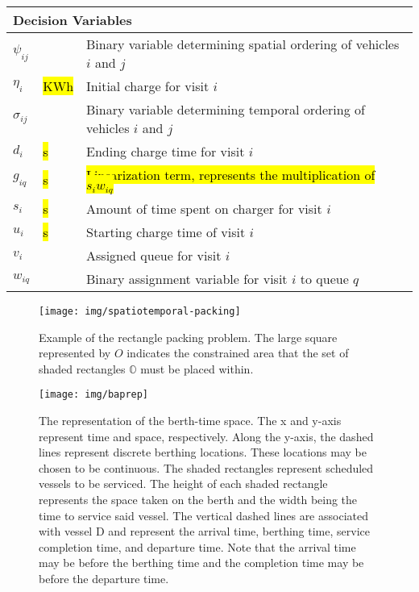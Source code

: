 \documentclass[utf8]{FrontiersinHarvard}
\begin{document}
\begin{table}[!htpb]
\begin{tabularx}{\textwidth}{l l l}
    \hline
    \multicolumn{3}{l}{Decision Variables}                                                                                          \\
    \hline
    $\psi_{ij}$     & & Binary variable determining spatial ordering of vehicles $i$ and $j$                                           \\
    $\eta_i$        & \hl{KWh} & Initial charge for visit $i$                                                                          \\
    $\sigma_{ij}$     & & Binary variable determining temporal ordering of vehicles $i$ and $j$                                          \\
    $d_i$        & \hl{s} & Ending charge time for visit $i$                                                                        \\
    $g_{iq}$     & \hl{s} & \hl{Linearization term, represents the multiplication of $s_i w_{iq}$}                                  \\
    $s_i$        & \hl{s} & Amount of time spent on charger for visit $i$                                                           \\
    $u_i$        & \hl{s} & Starting charge time of visit $i$                                                                       \\
    $v_i$        & & Assigned queue for visit $i$                                                                                   \\
    $w_{iq}$     & & Binary assignment variable for visit $i$ to queue $q$                                                          \\
   \bottomrule
  \end{tabularx}
\end{table}

\begin{figure}[htpb]
\centering
    \texttt{[image: img/spatiotemporal-packing]}
    \caption{Example of the rectangle packing problem. The large square represented by $O$ indicates the constrained
      area that the set of shaded rectangles $\mathbb{O}$ must be placed within.}
    \label{fig:packexample}
\end{figure}

\begin{figure}[ht]
\centering
    \texttt{[image: img/baprep]}
    \caption{The representation of the berth-time space. The x and y-axis represent time and space, respectively. Along
      the y-axis, the dashed lines represent discrete berthing locations. These locations may be chosen to be
      continuous. The shaded rectangles represent scheduled vessels to be serviced. The height of each shaded rectangle
      represents the space taken on the berth and the width being the time to service said vessel. The vertical dashed
      lines are associated with vessel D and represent the arrival time, berthing time, service completion time, and
      departure time. Note that the arrival time may be before the berthing time and the completion time may be before
      the departure time.}
    \label{fig:bap}
\end{figure}
\end{document}

